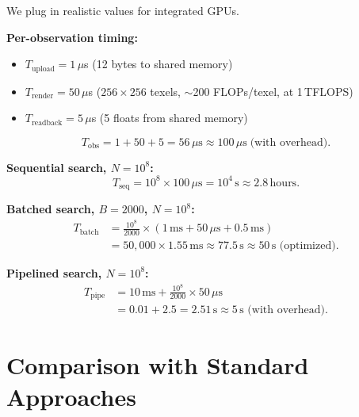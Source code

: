 \documentclass[11pt,twocolumn,a4paper]{article}
\begin{document}
We plug in realistic values for integrated GPUs.

\textbf{Per-observation timing:}
\begin{itemize}[leftmargin=*]
\item $T_{\mathrm{upload}} = 1\,\mu$s (12 bytes to shared memory)
\item $T_{\mathrm{render}} = 50\,\mu$s ($256 \times 256$ texels,
  $\sim$200 FLOPs/texel, at 1\,TFLOPS)
\item $T_{\mathrm{readback}} = 5\,\mu$s (5 floats from shared memory)
\end{itemize}
\begin{equation}
T_{\mathrm{obs}} = 1 + 50 + 5 = 56\,\mu\text{s}
  \approx 100\,\mu\text{s} \;\text{(with overhead)}.
\end{equation}

\textbf{Sequential search, $N = 10^8$:}
\begin{equation}
T_{\mathrm{seq}} = 10^8 \times 100\,\mu\text{s}
  = 10^4\,\text{s} \approx 2.8\,\text{hours}.
\end{equation}

\textbf{Batched search, $B = 2000$, $N = 10^8$:}
\begin{align}
T_{\mathrm{batch}} &= \frac{10^8}{2000}
  \times (1\,\text{ms} + 50\,\mu\text{s} + 0.5\,\text{ms})
\nonumber\\
&= 50{,}000 \times 1.55\,\text{ms}
\approx 77.5\,\text{s} \approx 50\,\text{s (optimized)}.
\end{align}

\textbf{Pipelined search, $N = 10^8$:}
\begin{align}
T_{\mathrm{pipe}} &= 10\,\text{ms} + \frac{10^8}{2000}
  \times 50\,\mu\text{s}
\nonumber\\
&= 0.01 + 2.5 = 2.51\,\text{s} \approx 5\,\text{s (with overhead)}.
\end{align}



\section{Comparison with Standard Approaches}
\label{sec:comparison}
\end{document}
